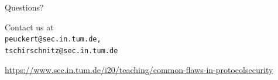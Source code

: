 \documentclass[xcolor={usenames,dvipsnames}]{beamer}
\begin{document}
\begin{frame}
	\begin{center}
		{\huge Questions?}

		\vspace{2cm}

		\begin{center}
			Contact us at \\ \texttt{peuckert@sec.in.tum.de, \\ tschirschnitz@sec.in.tum.de}
		\end{center}

		\vspace{1cm}

		\tiny
		\begin{center}
			\url{https://www.sec.in.tum.de/i20/teaching/common-flaws-in-protocolsecurity}
		\end{center}
	\end{center}
\end{frame}
\end{document}
